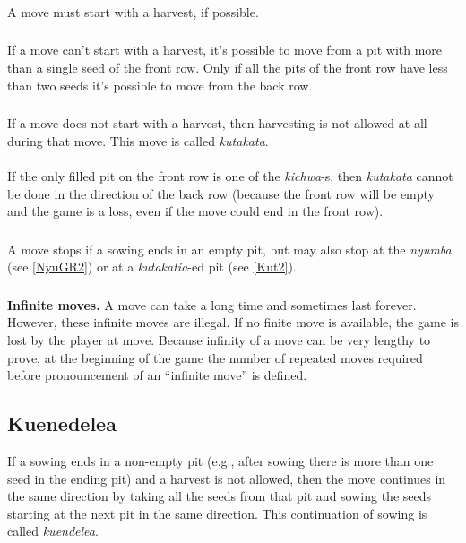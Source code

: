 \documentclass[12pt,a4paper]{article}
\begin{document}
\subsubsection{}\label{Mov1}
A move must start with a harvest, if possible.
\subsubsection{}\label{Mov2}
If a move can't start with a harvest, it's possible to move from a pit with more than a single seed of the front row. Only if all the pits of the front row have less than two seeds it's possible to move from the back row.
\subsubsection{}\label{Mov3}
If a move does not start with a harvest, then harvesting is not allowed at all during that move. This move is called {\it kutakata}.
\paragraph{}\label{Mov3.1} 
If the only filled pit on the front row is one of the {\it kichwa}-s, then {\it kutakata} cannot be done in the direction of the back row (because the front row will be empty and the game is a loss, even if the move could end in the front row).
\subsubsection{}\label{Mov4} 
A move stops if a sowing ends in an empty pit, but may also stop at the {\it nyumba} (see \ref{NyuGR2}) or at a {\it kutakatia}-ed pit (see \ref{Kut2}).
\subsubsection{}\label{Mov5} 
{\bf Infinite moves.} A move can take a long time and sometimes last forever. However, these infinite moves are illegal. If no finite move is available, the game is lost by the player at move. Because infinity of a move can be very lengthy to prove, at the beginning of the game the number of repeated moves required before pronouncement of an ``infinite move'' is defined.

\subsection{Kuenedelea}\label{Kue} 
If a sowing ends in a non-empty pit (e.g., after sowing there is more than one seed in the ending pit) and a harvest is not allowed, then the move continues in the same direction by taking all the seeds from that pit and sowing the seeds starting at the next pit in the same direction. This continuation of sowing is called {\it kuendelea}.
\end{document}
